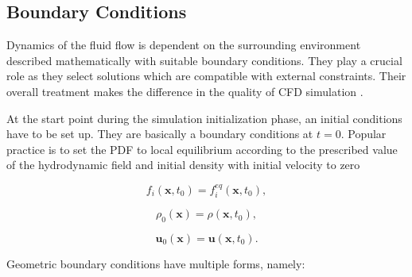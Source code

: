 %
%
%
%


\subsection{Boundary Conditions}
Dynamics of the fluid flow is dependent on the surrounding environment described mathematically with suitable boundary conditions. They play a crucial role as they select solutions which are compatible with external constraints. Their overall treatment makes the difference in the quality of CFD simulation \citep{succi2018}.

At the start point during the simulation initialization phase, an initial conditions have to be set up. They are basically a boundary conditions at $t = 0$. Popular practice is to set the PDF to local equilibrium according to the prescribed value of the hydrodynamic field and initial density with initial velocity to zero

\begin{equation}
	\label{eq:initial-conditions-pdf}
	f_i (\bm{x},t_0) = f_i^{eq} (\bm{x},t_0),
\end{equation}

\begin{equation}
	\label{eq:initial-conditions-density}
	\rho_0 (\bm{x}) = \rho (\bm{x},t_0), 
\end{equation}

\begin{equation}
	\label{eq:initial-conditions-velocity}
	\bm{u}_0 (\bm{x}) = \bm{u} (\bm{x},t_0).
\end{equation}

Geometric boundary conditions have multiple forms, namely:

